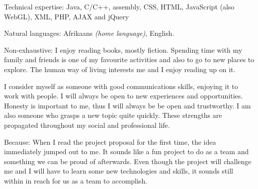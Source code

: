\spacedhrule{-0.2em}{-0.4em}



\inlineheadsection  %
  {Technical expertise:}
  {Java, C/C++, assembly, CSS, HTML, JavaScript (also WebGL), XML, PHP, AJAX and jQuery}

\vspace{0.5em}
\inlineheadsection
  {Natural languages:}
  {Afrikaans \emph{(home language)}, English.}

\spacedhrule{1.6em}{-0.4em}  

\inlineheadsection
  {Non-exhaustive:}
  {I enjoy reading books, mostly fiction. Spending time with my family and friends is one of my favourite activities and also to 		go to new places to explore. The human way of living interests me and I enjoy reading up on it.}

\spacedhrule{1.6em}{-0.4em}  
  

I consider myself as someone with good communications skills, enjoying it to work with people. I will always be open to new experiences and opportunities. Honesty is important to me, thus I will always be be open and trustworthy. I am also someone who grasps a new topic quite quickly. These strengths are propagated throughout my social and professional life.
   
\spacedhrule{1.6em}{-0.4em}  
  

\inlineheadsection
  {Because:}
  {When I read the project proposal for the first time, the idea immediately jumped out to me. It sounds like a fun project to do as a team and something we can be proud of afterwards. Even though the project will challenge me and I will have to learn some new technologies and skills, it sounds still within in reach for us as a team to accomplish. }